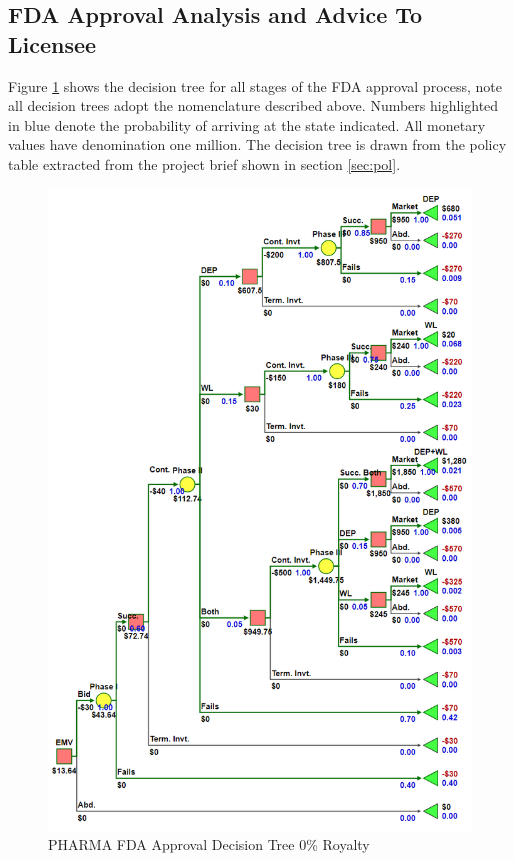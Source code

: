 \documentclass[journal]{IEEEtran}
\begin{document}
\subsection{FDA Approval Analysis and Advice To Licensee}
Figure \ref{pharma_tree} shows the decision tree for all stages of the FDA approval process, note all decision trees adopt the nomenclature described above. Numbers highlighted in blue denote the probability of arriving at the state indicated. All monetary values have denomination one million. The decision tree is drawn from the policy table extracted from the project brief shown in section \ref{sec:pol}.
\begin{figure}
\centering 
\includegraphics[width = 1.\linewidth]{pharma_tree}
\caption{PHARMA FDA Approval Decision Tree 0\% Royalty} 
\label{pharma_tree} 
\end{figure}
\end{document}
